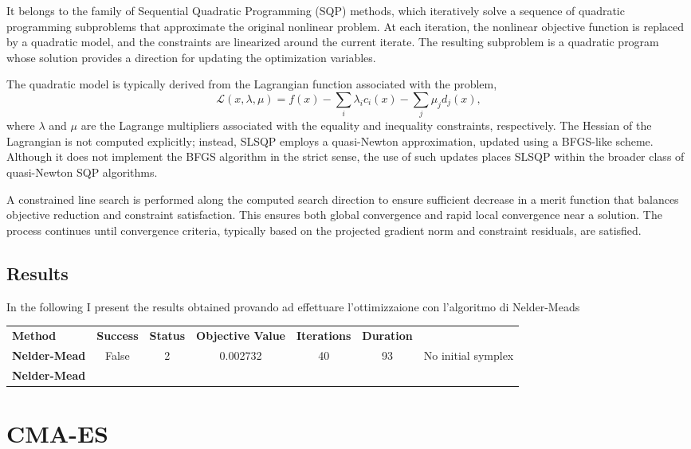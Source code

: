 It belongs to the family of Sequential Quadratic Programming (SQP) methods, which iteratively solve a sequence of quadratic programming subproblems that approximate the original nonlinear problem. 
At each iteration, the nonlinear objective function is replaced by a quadratic model, and the constraints are linearized around the current iterate. 
The resulting subproblem is a quadratic program whose solution provides a direction for updating the optimization variables.

The quadratic model is typically derived from the Lagrangian function associated with the problem,
\[
\mathcal{L}(x, \lambda, \mu) = f(x) - \sum_{i} \lambda_i c_i(x) - \sum_{j} \mu_j d_j(x),
\]
where \( \lambda \) and \( \mu \) are the Lagrange multipliers associated with the equality and inequality constraints, respectively. 
The Hessian of the Lagrangian is not computed explicitly; instead, SLSQP employs a quasi-Newton approximation, updated using a BFGS-like scheme. 
Although it does not implement the BFGS algorithm in the strict sense, the use of such updates places SLSQP within the broader class of quasi-Newton SQP algorithms.

A constrained line search is performed along the computed search direction to ensure sufficient decrease in a merit function that balances objective reduction and constraint satisfaction. 
This ensures both global convergence and rapid local convergence near a solution. 
The process continues until convergence criteria, typically based on the projected gradient norm and constraint residuals, are satisfied.

\subsection{Results}
In the following I present the results obtained provando ad effettuare l'ottimizzaione con l'algoritmo di Nelder-Meads

\begin{tabular}{lcccccc}
    \textbf{Method} & \textbf{Success} & \textbf{Status} & \textbf{Objective Value} & \textbf{Iterations} & \textbf{Duration}\\
    \textbf{Nelder-Mead} & False & 2 & 0.002732 & 40 & 93 & No initial symplex\\
    \textbf{Nelder-Mead}
\end{tabular}

\section{CMA-ES}

